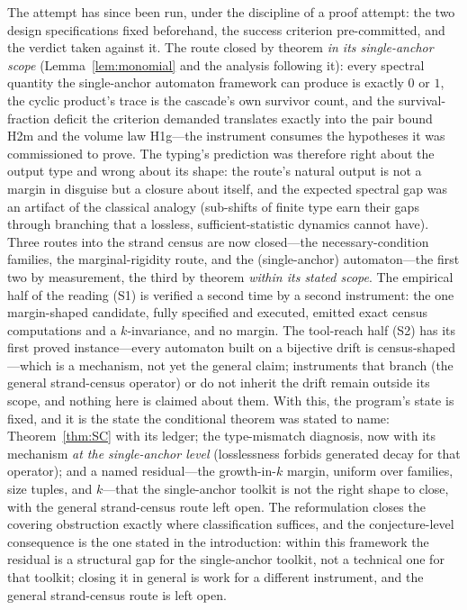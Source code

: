 \documentclass[11pt,a4paper]{article}
\numberwithin{equation}{section}
\theoremstyle{plain}
\theoremstyle{definition}
\theoremstyle{remark}
\begin{document}
The attempt has since been run, under the discipline of a proof
attempt: the two design specifications fixed beforehand, the success
criterion pre-committed, and the verdict taken against it. The route
closed by theorem \emph{in its single-anchor scope}
(Lemma~\ref{lem:monomial} and the analysis following it): every spectral
quantity the single-anchor automaton framework can produce is
exactly $0$ or $1$, the cyclic product's trace is the cascade's own
survivor count, and the survival-fraction deficit the criterion
demanded translates exactly into the pair bound H2m and the volume law
H1g---the instrument consumes the hypotheses it was commissioned to
prove. The typing's prediction was therefore right about the output
type and wrong about its shape: the route's natural output is not a
margin in disguise but a closure about itself, and the expected
spectral gap was an artifact of the classical analogy (sub-shifts of
finite type earn their gaps through branching that a lossless,
sufficient-statistic dynamics cannot have). Three routes into the
strand census are now closed---the necessary-condition families, the
marginal-rigidity route, and the (single-anchor) automaton---the first
two by measurement, the third by theorem \emph{within its stated
scope}. The empirical half of the reading (S1) is verified a second
time by a second instrument: the one margin-shaped candidate, fully
specified and executed, emitted exact census computations and a
$k$-invariance, and no margin. The tool-reach half (S2) has its first
proved instance---every automaton built on a bijective drift is
census-shaped---which is a mechanism, not yet the general claim;
instruments that branch (the general strand-census operator) or do not
inherit the drift remain outside its scope, and nothing here is claimed
about them. With this, the program's state is fixed, and it is the
state the conditional theorem was stated to name: Theorem~\ref{thm:SC}
with its ledger; the type-mismatch diagnosis, now with its mechanism
\emph{at the single-anchor level} (losslessness forbids generated decay
for that operator); and a named residual---the growth-in-$k$ margin,
uniform over families, size tuples, and $k$---that the single-anchor
toolkit is not the right shape to close, with the general strand-census
route left open. The reformulation closes the covering obstruction exactly
where classification suffices, and the conjecture-level consequence is
the one stated in the introduction: within this framework the residual
is a structural gap for the single-anchor toolkit, not a technical one
for that toolkit; closing it in general is work for a different
instrument, and the general strand-census route is left open.
\end{document}
